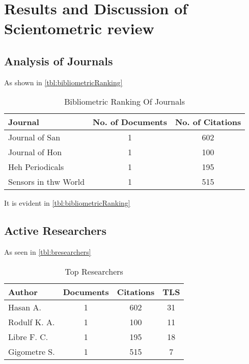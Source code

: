 \documentclass[journal, a4paper]{IEEEtran}
\begin{document}
\section{Results and Discussion of Scientometric review}
\lipsum[1]


\subsection{Analysis of Journals}
As shown in \autoref{tbl:bibliometricRanking} \lipsum[1]


\begin{table}[htbp]

  \centering
  \caption{Bibliometric Ranking Of Journals}
  \label{tbl:bibliometricRanking}
  \begin{tabular}{lcc}

      \toprule
      \textbf{Journal} & \textbf{No. of Documents} & \textbf{No. of Citations} \\
      \midrule
      Journal of San                   & 1     & 602   \\
      Journal of Hon                   & 1     & 100   \\
      Heh Periodicals                  & 1     & 195   \\
      Sensors in thw World             & 1     & 515   \\
      \bottomrule
  \end{tabular}
\end{table}

It is evident in \autoref{tbl:bibliometricRanking} \lipsum[1]


\subsection{Active Researchers}
As seen in \autoref{tbl:bresearchers} \lipsum[1]

\begin{table}[htbp]

  \centering
  \caption{Top Researchers}
  \label{tbl:bresearchers}
  \begin{tabular}{lccc}

      \toprule
      \textbf{Author} & \textbf{Documents} & \textbf{Citations} & \textbf{TLS} \\
      \midrule
      Hasan A.                   & 1     & 602   &  31         \\
      Rodulf K. A.               & 1     & 100   &  11         \\
      Libre F. C.                & 1     & 195   &  18         \\
      Gigometre S.               & 1     & 515   &  7          \\
      \bottomrule
  \end{tabular}
\end{table}
\end{document}
